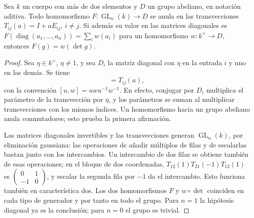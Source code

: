 \begin{lema}
\label{lem:ev-det}
Sea $k$ un cuerpo con más de dos elementos y $D$ un grupo abeliano, en notación aditiva. Todo homomorfismo $F:\operatorname{GL}_n(k)\to D$ se anula en las transvecciones $T_{ij}(a)=I+aE_{ij}$, $i\ne j$. Si además su valor en las matrices diagonales es $F(\operatorname{diag}(a_1,\ldots,a_n))=\sum_i w(a_i)$ para un homomorfismo $w:k^\times\to D$, entonces $F(g)=w(\det g)$.
\end{lema}
\begin{proof}
Sea $\eta\in k^\times$, $\eta\ne1$, y sea $D_i$ la matriz diagonal con $\eta$ en la entrada $i$ y uno en las demás. Se tiene
\begin{equation}
 [D_i,T_{ij}(a/(\eta-1))]=T_{ij}(a),
 \label{eq:ev-transveccion}
\end{equation}
con la convención $[u,w]=uwu^{-1}w^{-1}$. En efecto, conjugar por $D_i$ multiplica el parámetro de la transvección por $\eta$, y los parámetros se suman al multiplicar transvecciones con los mismos índices. Un homomorfismo hacia un grupo abeliano anula conmutadores; esto prueba la primera afirmación.

Las matrices diagonales invertibles y las transvecciones generan $\operatorname{GL}_n(k)$, por eliminación gaussiana: las operaciones de añadir múltiplos de filas y de escalarlas bastan junto con los intercambios. Un intercambio de dos filas se obtiene también de esas operaciones; en el bloque de dos coordenadas, $T_{12}(1)T_{21}(-1)T_{12}(1)$ es $\left(\begin{smallmatrix}0&1\\-1&0\end{smallmatrix}\right)$, y escalar la segunda fila por $-1$ da el intercambio. Esto funciona también en característica dos. Los dos homomorfismos $F$ y $w\circ\det$ coinciden en cada tipo de generador y por tanto en todo el grupo. Para $n=1$ la hipótesis diagonal ya es la conclusión; para $n=0$ el grupo es trivial.
\end{proof}

